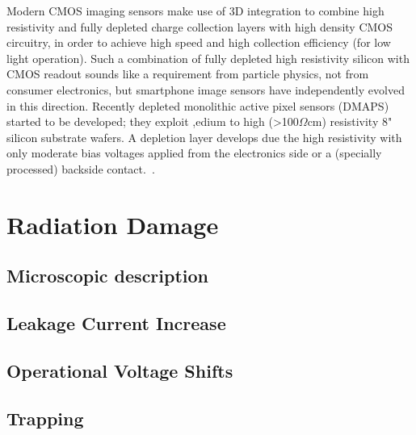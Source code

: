 
Modern CMOS imaging sensors make use of 3D integration to combine high resistivity and 
fully depleted charge collection layers with high density CMOS circuitry, in order to achieve high speed 
and high collection efficiency (for low light operation). Such a combination of fully depleted high 
resistivity silicon with CMOS readout sounds like a requirement from particle physics, not from 
consumer electronics, but smartphone image sensors have independently evolved in this 
direction. Recently depleted monolithic active pixel sensors 
(DMAPS) started to be developed; they exploit ,edium to high (>100$\Omega$cm) resistivity 8" silicon substrate wafers. A depletion layer develops due the high resistivity with only moderate bias voltages applied from the electronics side or a (specially processed) backside contact.~\cite{Garcia-Sciveres:2017ymt}.

\section{Radiation Damage}
\label{sec:RadDam}

\subsection{Microscopic description}

\subsection{Leakage Current Increase}

\subsection{Operational Voltage Shifts}

\subsection{Trapping}
\label{sec:trapping}
